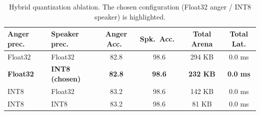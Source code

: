 \begin{table}[t]
\centering
\caption{Hybrid quantization ablation. The chosen configuration (Float32 anger / INT8 speaker) is highlighted.}
\label{tab:quant_ablation}
\begin{tabular}{llcccc}
\toprule
Anger prec.\ & Speaker prec.\ & Anger Acc.\ & Spk.\ Acc.\ & Total Arena & Total Lat. \\
\midrule
Float32 & Float32 & 82.8 & 98.6 & 294 KB & 0.0 ms \\
\textbf{Float32} & \textbf{INT8 (chosen)} & \textbf{82.8} & \textbf{98.6} & \textbf{232 KB} & \textbf{0.0 ms} \\
INT8 & Float32 & 83.2 & 98.6 & 142 KB & 0.0 ms \\
INT8 & INT8 & 83.2 & 98.6 & 81 KB & 0.0 ms \\
\bottomrule
\end{tabular}
\end{table}
